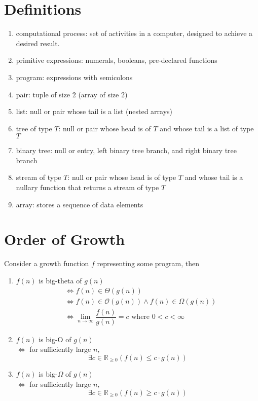 \documentclass[landscape, a4paper]{article}
\newcommand{\R}{\mathbb{R}}
\renewcommand{\And}{\wedge}
\newcommand{\customsection}[1]{
    \vspace{-5pt}
    \section*{#1}
    \vspace{-4pt}
}
\begin{document}
\small
\begin{multicols*}{4}
  \customsection{Definitions}
  \begin{enumerate}
    \item computational process: set of activities in a computer,
          designed to achieve a desired result.
    \item primitive expressions: numerals, booleans, pre-declared functions
    \item program: expressions with semicolons
    \item pair: tuple of size 2 (array of size 2)
    \item list: null or pair whose tail is a list (nested arrays)
    \item tree of type $T$: null or pair whose head is of $T$ and whose tail is a list of type $T$
    \item binary tree: null or entry, left binary tree branch, and right binary tree branch
    \item stream of type $T$: null or pair whose head is of type $T$ and whose tail is a nullary function that returns a stream of type $T$
    \item array: stores a sequence of data elements
  \end{enumerate}
  \customsection{Order of Growth}
  Consider a growth function $f$ representing some program, then
  \begin{enumerate}
    \item $f(n)$ is big-theta of $g(n)$
          \begin{align*}
             & \iff f(n)\in \Theta(g(n))                                           \\
             & \iff f(n)\in \mathcal{O}(g(n)) \And f(n)\in \Omega(g(n))            \\
             & \iff \lim_{n\to\infty}\dfrac{f(n)}{g(n)}=c \text{ where }0<c<\infty
          \end{align*}
    \item $f(n)$ is big-O of $g(n)$\\
          $\iff$ for sufficiently large $n,$
          \[\exists c\in\R_{\geq 0}(f(n)\leq c\cdot g(n))\]
    \item $f(n)$ is big-$\Omega$ of $g(n)$\\
          $\iff$ for sufficiently large $n,$
          \[\exists c\in\R_{\geq 0}(f(n)\geq c\cdot g(n))\]
  \end{enumerate}


\end{multicols*}
\end{document}
